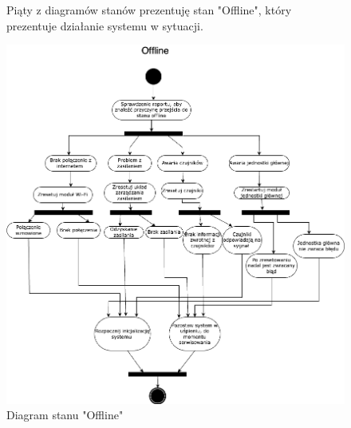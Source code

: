 \documentclass{article}
\begin{document}
\begin{figure}
    \centering
    \begin{minipage}{0.6\textwidth}
        \centering
        \large Piąty z diagramów stanów prezentuję stan "Offline", który prezentuje działanie systemu w sytuacji.
    \end{minipage}
    \includegraphics[scale=0.5]{offline.png}
    \caption{Diagram stanu "Offline"}
    \label{etykieta5}
\end{figure}
\end{document}
